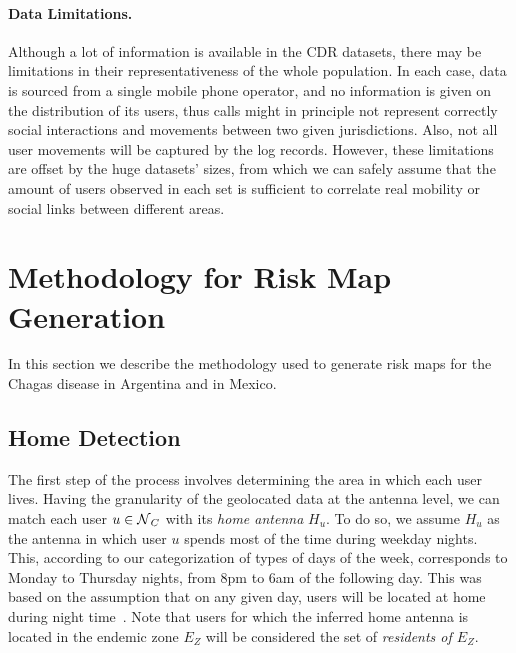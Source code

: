 \paragraph{Data Limitations.}
Although a lot of information is available in the CDR datasets, there may be limitations in their representativeness of the whole population. In each case, data is sourced from a single mobile phone operator, and no information is given on the distribution of its users, thus calls might in principle not represent correctly social interactions and movements between two given jurisdictions. Also, not all user movements will be captured by the log records. However, these limitations are offset by the huge datasets' sizes, from which we can safely assume that the amount of users observed in each set is sufficient to correlate real mobility or social links between different areas.






\section{Methodology for Risk Map Generation} \label{methods}

In this section we describe the methodology used to generate risk maps for the Chagas disease in Argentina and in Mexico.

\subsection{Home Detection}

    The first step of the process involves determining the area in which each user lives. Having the granularity of the geolocated data at the antenna level, we can match each user $u \in \operatorname{\mathcal{N}}_C$ with its \textit{home antenna} $H_u$.  To do so, we assume $H_u$ as the antenna in which user $u$ spends most of the time during weekday nights. This, according to our categorization of types of days of the week, corresponds to Monday to Thursday nights, from 8pm to 6am of the following day. This was based on the assumption that on any given day, users will be located at home during night time~\cite{sarraute2015socialevents,csaji2012exploring}. 
   Note that users for which the inferred home antenna is located in the endemic zone $E_Z$ will be considered the set of \textit{residents of $E_Z$}.

